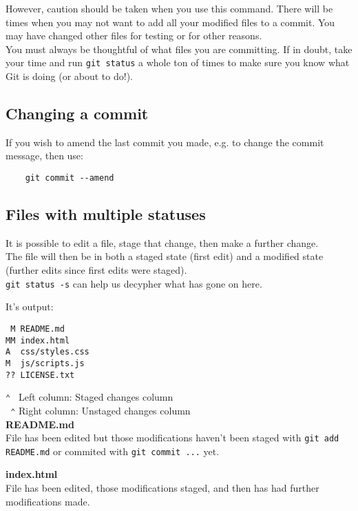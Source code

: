 However, caution should be taken when you use this command. There will be times when you may not want to add all your modified files to a commit. You may have changed other files for testing or for other reasons.
\\

You must always be thoughtful of what files you are committing. If in doubt, take your time and run \texttt{git status} a whole ton of times to make sure you know what Git is doing (or about to do!).

\subsection{Changing a commit}

If you wish to amend the last commit you made, e.g. to change the commit message, then use:

\begin{verbatim}
    git commit --amend
\end{verbatim}


\subsection{Files with multiple statuses}

It is possible to edit a file, stage that change, then make a further change.
\\

The file will then be in both a staged state (first edit) and a modified state (further edits since first edits were staged).
\\

\texttt{git status -s} can help us decypher what has gone on here.

It's output:

\begin{verbatim}
 M README.md
MM index.html
A  css/styles.css
M  js/scripts.js
?? LICENSE.txt
\end{verbatim}

\texttt{⌃ } Left column: Staged changes column
\\
\texttt{ ⌃} Right column: Unstaged changes column
\\

\textbf{README.md}
\\
File has been edited but those modifications haven't been staged with \texttt{git add README.md} or commited with \texttt{git commit ...} yet.


\textbf{index.html}
\\
File has been edited, those modifications staged, and then has had further modifications made.
\\

